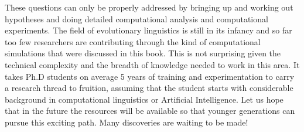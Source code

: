 These questions can only be properly addressed by bringing up and working out hypotheses and
doing detailed computational analysis and computational 
experiments. The field of evolutionary linguistics is still in its infancy and so far too few researchers
are contributing through the kind of computational simulations that were discussed in this book. This is not surprising given 
the technical complexity and the breadth of knowledge needed to work in this area. It takes Ph.D students on average 5
years of training and experimentation to carry a research thread to 
fruition, assuming that the student starts with considerable background in computational linguistics or Artificial Intelligence.
Let us hope that in the future the resources will be available so that younger generations can pursue this exciting path. 
Many discoveries are waiting to be made! 

